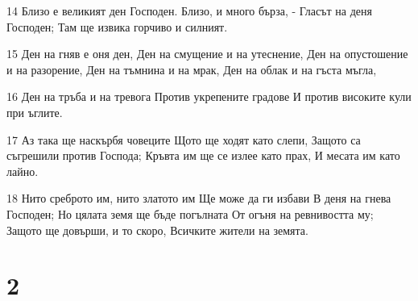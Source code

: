 \par 14 Близо е великият ден Господен. Близо, и много бърза, - Гласът на деня Господен; Там ще извика горчиво и силният.
\par 15 Ден на гняв е оня ден, Ден на смущение и на утеснение, Ден на опустошение и на разорение, Ден на тъмнина и на мрак, Ден на облак и на гъста мъгла,
\par 16 Ден на тръба и на тревога Против укрепените градове И против високите кули при ъглите.
\par 17 Аз така ще наскърбя човеците Щото ще ходят като слепи, Защото са съгрешили против Господа; Кръвта им ще се излее като прах, И месата им като лайно.
\par 18 Нито среброто им, нито златото им Ще може да ги избави В деня на гнева Господен; Но цялата земя ще бъде погълната От огъня на ревнивостта му; Защото ще довърши, и то скоро, Всичките жители на земята.

\chapter{2}

